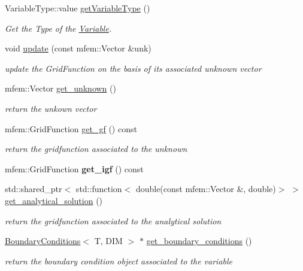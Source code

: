 \begin{DoxyCompactItemize}
Variable\+Type\+::value \hyperlink{classVariable_aac48a5e228ccfdbbef672f0ac43c284a}{get\+Variable\+Type} ()
\begin{DoxyCompactList}\small\item\em Get the Type of the \hyperlink{classVariable}{Variable}. \end{DoxyCompactList}\item 
\mbox{\label{classVariable_a6188390bf40a0aaedc2eb2da86e997bc}} 
void \hyperlink{classVariable_a6188390bf40a0aaedc2eb2da86e997bc}{update} (const mfem\+::\+Vector \&unk)
\begin{DoxyCompactList}\small\item\em update the Grid\+Function on the basis of its associated unknown vector \end{DoxyCompactList}\item 
mfem\+::\+Vector \hyperlink{classVariable_acf251fb024a0fd8fab0ca0b28df79c12}{get\+\_\+unknown} ()
\begin{DoxyCompactList}\small\item\em return the unkown vector \end{DoxyCompactList}\item 
mfem\+::\+Grid\+Function \hyperlink{classVariable_a19c2d3361e85a75225052d3fc12c641b}{get\+\_\+gf} () const
\begin{DoxyCompactList}\small\item\em return the gridfunction associated to the unknown \end{DoxyCompactList}\item 
\mbox{\label{classVariable_ab6dc5e1dc88c758bd864fb2699e3ed27}} 
mfem\+::\+Grid\+Function {\bfseries get\+\_\+igf} () const
\item 
std\+::shared\+\_\+ptr$<$ std\+::function$<$ double(const mfem\+::\+Vector \&, double)$>$ $>$ \hyperlink{classVariable_acc06b9dfda611f1ad3b1c6d6b4386050}{get\+\_\+analytical\+\_\+solution} ()
\begin{DoxyCompactList}\small\item\em return the gridfunction associated to the analytical solution \end{DoxyCompactList}\item 
\hyperlink{classBoundaryConditions}{Boundary\+Conditions}$<$ T, D\+IM $>$ $\ast$ \hyperlink{classVariable_ab85faebdc51081412859462f7e44a1e2}{get\+\_\+boundary\+\_\+conditions} ()
\begin{DoxyCompactList}\small\item\em return the boundary condition object associated to the variable \end{DoxyCompactList}\item 

\end{DoxyCompactItemize}
